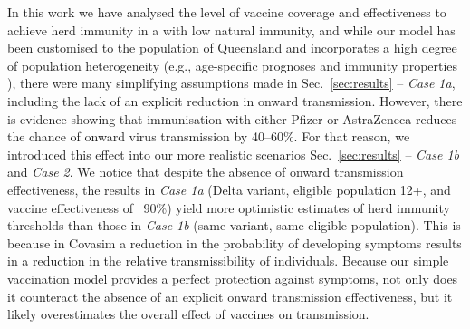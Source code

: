 \documentclass[article, a4, authoryear]{elsarticle}
\begin{document}
In this work we have analysed the level of vaccine coverage and effectiveness to achieve herd immunity in a with low natural immunity, and while our model has been customised to the population of Queensland and incorporates a high degree of population heterogeneity (e.g., age-specific prognoses and immunity properties \cite{waites2022ptrsa-compositional}), there were many simplifying assumptions made in Sec.~\ref{sec:results} -- \textit{Case 1a}, including the lack of an explicit reduction in onward transmission. However, there is evidence showing that immunisation with either Pfizer \cite{harris2021effect,pruna2022onward} or AstraZeneca \cite{harris2021effect} reduces the chance of onward virus transmission by 40–60\%. For that reason, we introduced this effect into our more realistic scenarios Sec.~\ref{sec:results} -- \textit{Case 1b} and \textit{Case 2}. We notice that despite the absence of onward transmission effectiveness, the results in \textit{Case 1a} (Delta variant, eligible population 12+, and vaccine effectiveness of ~90\%) yield more optimistic estimates of herd immunity thresholds than those in \textit{Case 1b} (same variant, same eligible population). This is because in Covasim a reduction in the probability of developing symptoms results in a reduction in the relative transmissibility of individuals. Because our simple vaccination model provides a perfect protection against symptoms, not only does it counteract the absence of an explicit onward transmission effectiveness, but it likely overestimates the overall effect of vaccines on transmission.
\end{document}

